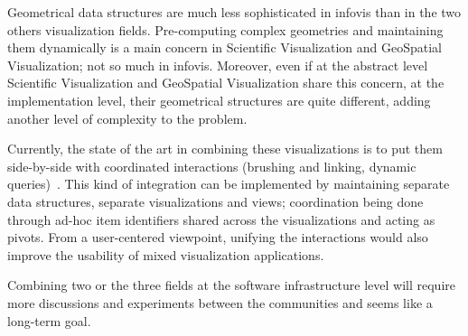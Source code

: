 Geometrical data structures are much less sophisticated in infovis
than in the two others visualization fields.  Pre-computing complex
geometries and maintaining them dynamically is a main concern in
Scientific Visualization and GeoSpatial Visualization; not so much in
infovis.  Moreover, even if at the abstract level Scientific
Visualization and GeoSpatial Visualization share this concern, at the
implementation level, their geometrical structures are quite
different, adding another level of complexity to the problem.

Currently, the state of the art in combining these visualizations is
to put them side-by-side with coordinated interactions (brushing and
linking, dynamic queries)~\cite{Coord3D}.  This kind of integration 
can be implemented by maintaining separate data structures, separate
visualizations and views; coordination being done through ad-hoc item
identifiers shared across the visualizations and acting as pivots.
From a user-centered viewpoint, unifying the interactions would also
improve the usability of mixed visualization applications.

Combining two or the three fields at the software infrastructure
level will require more discussions and experiments between the
communities and seems like a long-term goal.
